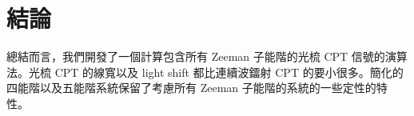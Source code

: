 \documentclass[11pt,a4paper]{article}
\begin{document}
\section{結論}
總結而言，我們開發了一個計算包含所有 Zeeman 子能階的光梳 CPT 信號的演算法。光梳 CPT 的線寬以及 light shift 都比連續波鐳射 CPT 的要小很多。簡化的四能階以及五能階系統保留了考慮所有 Zeeman 子能階的系統的一些定性的特性。
{}

\end{document}
